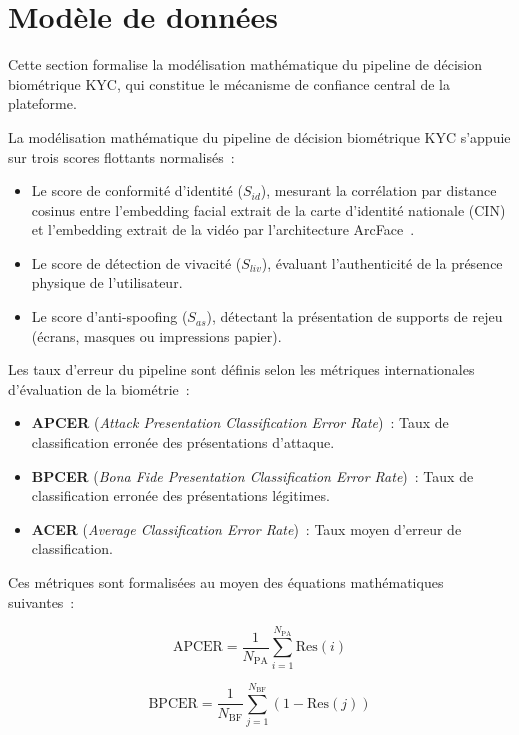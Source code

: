 \section{Modèle de données}
\label{sec:modele-donnees}

Cette section formalise la modélisation mathématique du pipeline de décision biométrique KYC, qui constitue le mécanisme de confiance central de la plateforme.

La modélisation mathématique du pipeline de décision biométrique KYC s'appuie sur trois scores flottants normalisés~:
\begin{itemize}
  \item Le score de conformité d'identité ($S_{id}$), mesurant la corrélation par distance cosinus entre l'embedding facial extrait de la carte d'identité nationale (CIN) et l'embedding extrait de la vidéo par l'architecture ArcFace~\cite{deng_arcface_2019}.
  \item Le score de détection de vivacité ($S_{liv}$), évaluant l'authenticité de la présence physique de l'utilisateur.
  \item Le score d'anti-spoofing ($S_{as}$), détectant la présentation de supports de rejeu (écrans, masques ou impressions papier).
\end{itemize}

Les taux d'erreur du pipeline sont définis selon les métriques internationales d'évaluation de la biométrie~:
\begin{itemize}
  \item \textbf{APCER} (\textit{Attack Presentation Classification Error Rate})~: Taux de classification erronée des présentations d'attaque.
  \item \textbf{BPCER} (\textit{Bona Fide Presentation Classification Error Rate})~: Taux de classification erronée des présentations légitimes.
  \item \textbf{ACER} (\textit{Average Classification Error Rate})~: Taux moyen d'erreur de classification.
\end{itemize}

Ces métriques sont formalisées au moyen des équations mathématiques suivantes~:

\begin{equation}
\text{APCER} = \frac{1}{N_{\text{PA}}} \sum_{i=1}^{N_{\text{PA}}} \text{Res}(i)
\end{equation}

\begin{equation}
\text{BPCER} = \frac{1}{N_{\text{BF}}} \sum_{j=1}^{N_{\text{BF}}} (1 - \text{Res}(j))
\end{equation}

